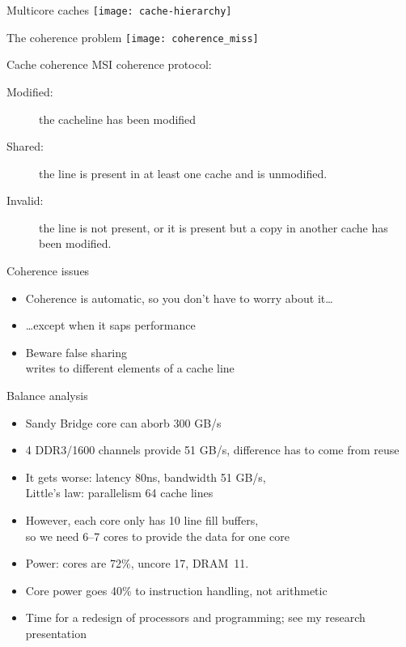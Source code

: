\begin{numberedframe}{Multicore caches}
  \texttt{[image: cache-hierarchy]}
\end{numberedframe}

\begin{numberedframe}{The coherence problem}
  \texttt{[image: coherence\_miss]}
\end{numberedframe}

\begin{numberedframe}{Cache coherence}
\acf{MSI} coherence protocol:
\begin{description}
\item [Modified:] the cacheline has been modified
\item [Shared:] the line is present in at least one cache and is unmodified.
\item [Invalid:] the line is not present, or it
  is present but a copy in another cache has been modified.
\end{description}
\end{numberedframe}

\begin{numberedframe}{Coherence issues}
  \begin{itemize}
  \item Coherence is automatic, so you don't have to worry about it\ldots
  \item \ldots except when it saps performance
  \item Beware false sharing\\
    writes to different elements of a cache line
  \end{itemize}
\end{numberedframe}

\begin{numberedframe}{Balance analysis}
  \begin{itemize}
  \item Sandy Bridge core can aborb 300 GB/s
  \item 4 DDR3/1600 channels provide 51 GB/s, difference has to come from reuse
  \item It gets worse: latency 80ns, bandwidth 51 GB/s, \\
    Little's law: parallelism 64 cache lines
  \item However, each core only has 10 line fill buffers,\\
    so we need 6--7 cores to provide the data for one core
  \item Power: cores are 72\%, uncore 17, DRAM~11.
  \item Core power goes 40\% to instruction handling, not arithmetic
  \item Time for a redesign of processors and programming; see my research presentation
  \end{itemize}
\end{numberedframe}

